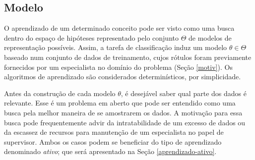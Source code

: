 \subsection{Modelo}\label{defmod}
O aprendizado de um determinado conceito pode ser visto como uma busca dentro do espaço de hipóteses representado pelo conjunto $\Theta$ de modelos de representação possíveis.
Assim, a tarefa de classificação induz um modelo $\theta \in \Theta$ baseado num conjunto de dados de treinamento, cujos rótulos foram previamente fornecidos por um especialista no domínio do problema (Seção \ref{motiv}).
Os algoritmos de aprendizado são considerados determinísticos, por simplicidade.

Antes da construção de cada modelo $\theta$, é desejável saber qual parte dos dados é relevante.
Esse é um problema em aberto que pode ser entendido como uma busca pela melhor maneira de se amostrarem os dados.
A motivação para essa busca pode frequentemente advir da intratabilidade de um excesso de dados ou da escassez de recursos para manutenção de um especialista no papel de supervisor.
Ambos os casos podem se beneficiar do tipo de aprendizado denominado \textit{ativo}; que será apresentado na Seção \ref{aprendizado-ativo}.


